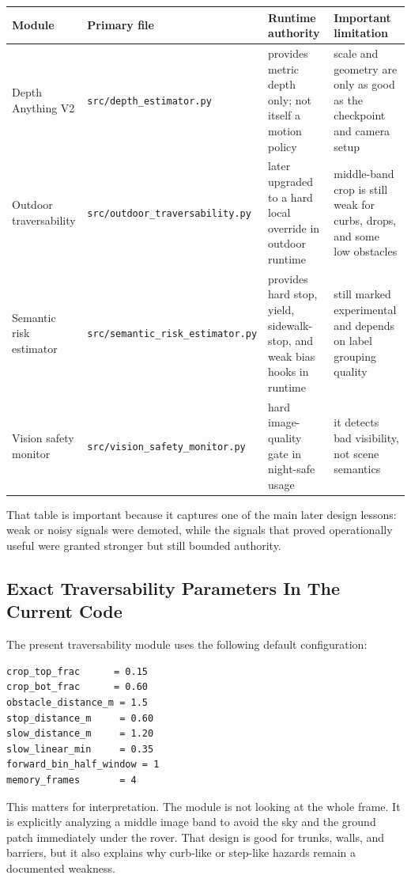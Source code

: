\documentclass[11pt]{article}
\begin{document}
\begin{center}
\begin{tabular}{p{}p{}p{}p{}}
\toprule
\textbf{Module} & \textbf{Primary file} & \textbf{Runtime authority} & \textbf{Important limitation} \\
\midrule
Depth Anything V2 & \texttt{src/depth\_estimator.py} & provides metric depth only; not itself a motion policy & scale and geometry are only as good as the checkpoint and camera setup \\
Outdoor traversability & \texttt{src/outdoor\_traversability.py} & later upgraded to a hard local override in outdoor runtime & middle-band crop is still weak for curbs, drops, and some low obstacles \\
Semantic risk estimator & \texttt{src/semantic\_risk\_estimator.py} & provides hard stop, yield, sidewalk-stop, and weak bias hooks in runtime & still marked experimental and depends on label grouping quality \\
Vision safety monitor & \texttt{src/vision\_safety\_monitor.py} & hard image-quality gate in night-safe usage & it detects bad visibility, not scene semantics \\
\bottomrule
\end{tabular}
\end{center}

That table is important because it captures one of the main later design lessons: weak or noisy signals were demoted, while the signals that proved operationally useful were granted stronger but still bounded authority.

\subsection{Exact Traversability Parameters In The Current Code}
The present traversability module uses the following default configuration:
\begin{verbatim}
crop_top_frac      = 0.15
crop_bot_frac      = 0.60
obstacle_distance_m = 1.5
stop_distance_m     = 0.60
slow_distance_m     = 1.20
slow_linear_min     = 0.35
forward_bin_half_window = 1
memory_frames       = 4
\end{verbatim}

This matters for interpretation. The module is not looking at the whole frame. It is explicitly analyzing a middle image band to avoid the sky and the ground patch immediately under the rover. That design is good for trunks, walls, and barriers, but it also explains why curb-like or step-like hazards remain a documented weakness.
\end{document}
